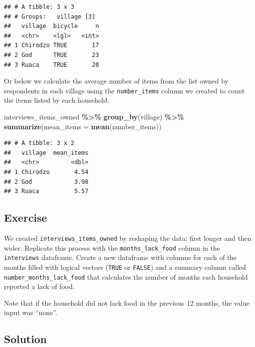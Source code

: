 \documentclass[
]{article}
\newenvironment{Shaded}{\begin{snugshade}}{\end{snugshade}}
\newcommand{\AttributeTok}[1]{\textcolor[rgb]{0.13,0.29,0.53}{#1}}
\newcommand{\FunctionTok}[1]{\textcolor[rgb]{0.13,0.29,0.53}{\textbf{#1}}}
\newcommand{\NormalTok}[1]{#1}
\newcommand{\SpecialCharTok}[1]{\textcolor[rgb]{0.81,0.36,0.00}{\textbf{#1}}}
\begin{document}
\begin{verbatim}
## # A tibble: 3 x 3
## # Groups:   village [3]
##   village  bicycle     n
##   <chr>    <lgl>   <int>
## 1 Chirodzo TRUE       17
## 2 God      TRUE       23
## 3 Ruaca    TRUE       20
\end{verbatim}

Or below we calculate the average number of items from the list owned by
respondents in each village using the \texttt{number\_items} column we
created to count the items listed by each household.

\begin{Shaded}
\begin{Highlighting}[]
\NormalTok{interviews\_items\_owned }\SpecialCharTok{\%\textgreater{}\%}
    \FunctionTok{group\_by}\NormalTok{(village) }\SpecialCharTok{\%\textgreater{}\%}
    \FunctionTok{summarize}\NormalTok{(}\AttributeTok{mean\_items =} \FunctionTok{mean}\NormalTok{(number\_items))}
\end{Highlighting}
\end{Shaded}

\begin{verbatim}
## # A tibble: 3 x 2
##   village  mean_items
##   <chr>         <dbl>
## 1 Chirodzo       4.54
## 2 God            3.98
## 3 Ruaca          5.57
\end{verbatim}

\subsection{Exercise}\label{exercise}

We created \texttt{interviews\_items\_owned} by reshaping the data:
first longer and then wider. Replicate this process with the
\texttt{months\_lack\_food} column in the \texttt{interviews} dataframe.
Create a new dataframe with columns for each of the months filled with
logical vectors (\texttt{TRUE} or \texttt{FALSE}) and a summary column
called \texttt{number\_months\_lack\_food} that calculates the number of
months each household reported a lack of food.

Note that if the household did not lack food in the previous 12 months,
the value input was ``none''.

\subsection{Solution}\label{solution}
\end{document}
